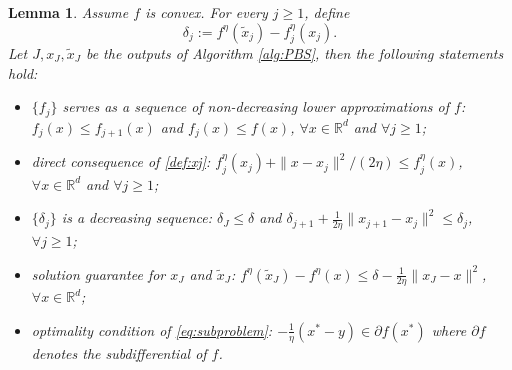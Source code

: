 \documentclass[11pt,letterpaper]{article}
\newcommand{\chen}{\color{cyan}}
\newtheorem{lemma}[thm]{Lemma}
\newcommand{\R}{\mathbb{R}}
\newcommand{\tx}{\tilde x}
\begin{document}
\begin{lemma}\label{lem:bundle}
Assume $f$ is convex. 
For every $j\ge 1$, define 
\begin{equation}\label{def:tj}
    \delta_j:=f^\eta(\tx_j) - f_j^\eta(x_j).
\end{equation}
Let $J, x_J, \tilde x_J$ be the outputs of Algorithm \ref{alg:PBS}, then the following statements hold:
\begin{itemize}
    \item[a)] $\{f_j\}$ serves as a sequence of non-decreasing lower approximations of $f$: $f_j(x)\le f_{j+1}(x)$ and $f_j(x)\le f(x)$, $\forall x\in \R^d$ and $\forall j\ge 1$;

    \vspace{0.2cm}
    
    \item[b)] direct consequence of \eqref{def:xj}: $f_j^\eta(x_j) + \|x-x_j\|^2/(2\eta) \le f_j^\eta(x)$, $\forall x\in \R^d$ and $\forall j \ge 1$;

    \vspace{0.2cm}
    
    \item[c)] $\{\delta_j\}$ is a decreasing sequence:
    $\delta_J \le \delta$ and $\delta_{j+1} + \frac{1}{2\eta}\|x_{j+1}-x_j\|^2 \le \delta_j$, $\forall j \ge 1$;

    \vspace{0.2cm}
    
    \item[d)] solution guarantee for $x_J$ and $\tx_J$:
    $f^\eta(\tilde x_J) - f^\eta(x) \le\delta - \frac1{2\eta}\|x_J - x\|^2$, $\forall x\in \R^d$;

    \vspace{0.2cm}
    
    \item[e)] optimality condition of \eqref{eq:subproblem}: $ - \frac{1}{\eta} (x^*-y) \in\partial f(x^*)$ where $\partial f$ denotes the subdifferential of $f$.
\end{itemize}
\end{lemma}
\end{document}
